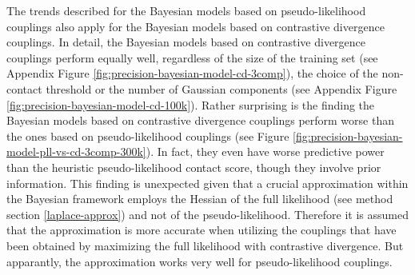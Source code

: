 \documentclass[11pt,a4paper,twoside]{book}
\theoremstyle{definition}
\theoremstyle{definition}
\theoremstyle{remark}
\begin{document}
The trends described for the Bayesian models based on pseudo-likelihood
couplings also apply for the Bayesian models based on contrastive
divergence couplings. In detail, the Bayesian models based on
contrastive divergence couplings perform equally well, regardless of the
size of the training set (see Appendix Figure
\ref{fig:precision-bayesian-model-cd-3comp}), the choice of the
non-contact threshold or the number of Gaussian components (see Appendix
Figure \ref{fig:precision-bayesian-model-cd-100k}). Rather surprising is
the finding the Bayesian models based on contrastive divergence
couplings perform worse than the ones based on pseudo-likelihood
couplings (see Figure
\ref{fig:precision-bayesian-model-pll-vs-cd-3comp-300k}). In fact, they
even have worse predictive power than the heuristic pseudo-likelihood
contact score, though they involve prior information. This finding is
unexpected given that a crucial approximation within the Bayesian
framework employs the Hessian of the full likelihood (see method section
\ref{laplace-approx}) and not of the pseudo-likelihood. Therefore it is
assumed that the approximation is more accurate when utilizing the
couplings that have been obtained by maximizing the full likelihood with
contrastive divergence. But apparantly, the approximation works very
well for pseudo-likelihood couplings.
\end{document}
